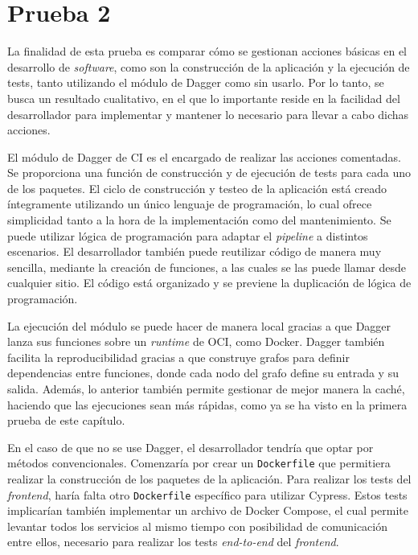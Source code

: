 \section{Prueba 2}

La finalidad de esta prueba es comparar cómo se gestionan acciones básicas en el desarrollo de \textit{software}, como son la construcción de la aplicación y la ejecución de tests, tanto utilizando el módulo de Dagger como sin usarlo. Por lo tanto, se busca un resultado cualitativo, en el que lo importante reside en la facilidad del desarrollador para implementar y mantener lo necesario para llevar a cabo dichas acciones.

El módulo de Dagger de CI es el encargado de realizar las acciones comentadas. Se proporciona una función de construcción y de ejecución de tests para cada uno de los paquetes. El ciclo de construcción y testeo de la aplicación está creado íntegramente utilizando un único lenguaje de programación, lo cual ofrece simplicidad tanto a la hora de la implementación como del mantenimiento. Se puede utilizar lógica de programación para adaptar el \textit{pipeline} a distintos escenarios. El desarrollador también puede reutilizar código de manera muy sencilla, mediante la creación de funciones, a las cuales se las puede llamar desde cualquier sitio. El código está organizado y se previene la duplicación de lógica de programación.

La ejecución del módulo se puede hacer de manera local gracias a que Dagger lanza sus funciones sobre un \textit{runtime} de OCI, como Docker. Dagger también facilita la reproducibilidad gracias a que construye grafos para definir dependencias entre funciones, donde cada nodo del grafo define su entrada y su salida. Además, lo anterior también permite gestionar de mejor manera la caché, haciendo que las ejecuciones sean más rápidas, como ya se ha visto en la primera prueba de este capítulo.

En el caso de que no se use Dagger, el desarrollador tendría que optar por métodos convencionales. Comenzaría por crear un \texttt{Dockerfile} que permitiera realizar la construcción de los paquetes de la aplicación. Para realizar los tests del \textit{frontend}, haría falta otro \texttt{Dockerfile} específico para utilizar Cypress. Estos tests implicarían también implementar un archivo de Docker Compose, el cual permite levantar todos los servicios al mismo tiempo con posibilidad de comunicación entre ellos, necesario para realizar los tests \textit{end-to-end} del \textit{frontend}. 

